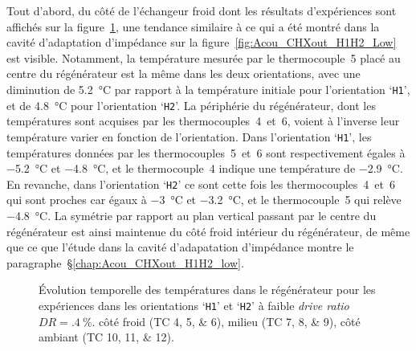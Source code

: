 Tout d'abord, du côté de l'échangeur froid dont les résultats d'expériences sont affichés sur la figure~\ref{fig:Acou_CHXin_H1H2_Low}, une tendance similaire à ce qui a été montré dans la cavité d'adaptation d'impédance sur la figure~\ref{fig:Acou_CHXout_H1H2_Low} est visible. Notamment, la température mesurée par le thermocouple~5 placé au centre du régénérateur est la même dans les deux orientations, avec une diminution de \qty{5.2}{\degreeCelsius} par rapport à la température initiale pour l'orientation `\texttt{H1}', et de \qty{4.8}{\degreeCelsius} pour l'orientation `\texttt{H2}'. La périphérie du régénérateur, dont les températures sont acquises par les thermocouples~4~et~6, voient à l'inverse leur température varier en fonction de l'orientation. Dans l'orientation `\texttt{H1}', les températures données par les thermocouples~5~et~6 sont respectivement égales à \qty{-5.2}{\degreeCelsius} et \qty{-4.8}{\degreeCelsius}, et le thermocouple~4 indique une température de \qty{-2.9}{\degreeCelsius}. En revanche, dans l'orientation `\texttt{H2}' ce sont cette fois les thermocouples~4~et~6 qui sont proches car égaux à \qty{-3}{\degreeCelsius} et \qty{-3.2}{\degreeCelsius}, et le thermocouple~5 qui relève \qty{-4.8}{\degreeCelsius}. La symétrie par rapport au plan vertical passant par le centre du régénérateur est ainsi maintenue du côté froid intérieur du régénérateur, de même que ce que l'étude dans la cavité d'adapatation d'impédance montre le paragraphe~§\ref{chap:Acou_CHXout_H1H2_low}.

\begin{figure}[!ht]
    \centering
	\begin{subfigure}{\textwidth}
		\centering
        
		\caption{}
		\label{fig:Acou_CHXin_H1H2_Low}
	\end{subfigure}		
	\begin{subfigure}{\textwidth}
		\centering
        
		\caption{}
		\label{fig:Acou_Regmid_H1H2_Low}
	\end{subfigure}
	\begin{subfigure}{\textwidth}
		\centering
        
		\caption{}
		\label{fig:Acou_AHXin_H1H2_Low}
	\end{subfigure}	
    \caption{\'Evolution temporelle des températures dans le régénérateur pour les expériences dans les orientations `\texttt{H1}' et `\texttt{H2}' à faible \textit{drive ratio} $DR=\qty{.4}{\percent}$.  côté froid (TC \numlist{4;5;6}),  milieu (TC \numlist{7;8;9}),  côté ambiant (TC \numlist{10;11;12}).} 
    \label{fig:Acou_H1H2_Low}
\end{figure}

